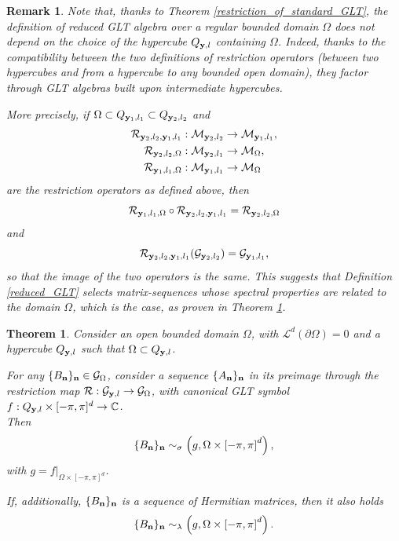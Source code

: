 \documentclass[10pt,a4paper]{amsart}
\newtheorem{thm}{Theorem}
\newtheorem{rem}{Remark}
\begin{document}
\begin{rem}\label{well-posedness}
    Note that, thanks to Theorem \ref{restriction_of_standard_GLT}, the definition of reduced GLT algebra over a regular bounded domain $\Omega$ does not depend on the choice of the hypercube $Q_{\mathbf y,l}$ containing $\Omega$. Indeed, thanks to the compatibility between the two definitions of restriction operators (between two hypercubes and from a hypercube to any bounded open domain), they factor through GLT algebras built upon intermediate hypercubes. 
    
    More precisely, if $\Omega\subset Q_{\mathbf y_1,l_1}\subset Q_{\mathbf y_2,l_2}$ and 
    \begin{align*}
        \mathcal{R}_{\mathbf y_2,l_2,\mathbf y_1,l_1}&:\mathcal{M}_{\mathbf y_2,l_2}\to\mathcal{M}_{\mathbf y_1,l_1},\\
        \mathcal{R}_{\mathbf y_2,l_2,\Omega}&:\mathcal{M}_{\mathbf y_2,l_1}\to\mathcal{M}_{\Omega},\\
        \mathcal{R}_{\mathbf y_1,l_1,\Omega}&:\mathcal{M}_{\mathbf y_1,l_1}\to\mathcal{M}_{\Omega}
    \end{align*}
    are the restriction operators as defined above, then 
    \begin{equation*}
         \mathcal{R}_{\mathbf y_1,l_1,\Omega}\circ\mathcal{R}_{\mathbf y_2,l_2,\mathbf y_1,l_1}=\mathcal{R}_{\mathbf y_2,l_2,\Omega}
    \end{equation*}
    and 
    \begin{equation*}
        \mathcal{R}_{\mathbf y_2,l_2,\mathbf y_1,l_1}(\mathcal{G}_{\mathbf y_2,l_2})=\mathcal{G}_{\mathbf y_1,l_1},
    \end{equation*}
    so that the image of the two operators is the same. This suggests that Definition \ref{reduced_GLT} selects matrix-sequences whose spectral properties are related to the domain $\Omega$, which is the case, as proven in Theorem \ref{spectra_reduced_GLT}. 
\end{rem}

\begin{thm}\label{spectra_reduced_GLT}
    Consider an open bounded domain $\Omega$, with $\mathcal{L}^d(\partial\Omega)=0$ and a hypercube $Q_{\mathbf y,l}$ such that $\Omega\subset Q_{\mathbf y,l}$. 
    
    For any $\{B_{\mathbf n}\}_\mathbf n\in\mathcal{G}_{\Omega}$, consider a sequence $\{A_{\mathbf n}\}_\mathbf n$ in its preimage through the restriction map $\mathcal{R}:\mathcal{G}_{\mathbf y,l}\to\mathcal{G}_{\Omega}$, with canonical GLT symbol $f:Q_{\mathbf y,l}\times[-\pi,\pi]^d\to\mathbb{C}$.\\
    Then
    \begin{equation*}
        \{B_{\mathbf n}\}_{\mathbf n}\sim_{\sigma}\left(g,\Omega\times\left[-\pi,\pi\right]^d\right),
    \end{equation*}
    with $g=f|_{\Omega\times[-\pi,\pi]^d}$.
    
    If, additionally, $\{B_\mathbf n\}_\mathbf n$ is a sequence of Hermitian matrices, then it also holds 
    \begin{equation*}
        \{B_{\mathbf n}\}_{\mathbf n}\sim_{\lambda}\left(g,\Omega\times\left[-\pi,\pi\right]^d\right).
    \end{equation*}
\end{thm}
\end{document}
